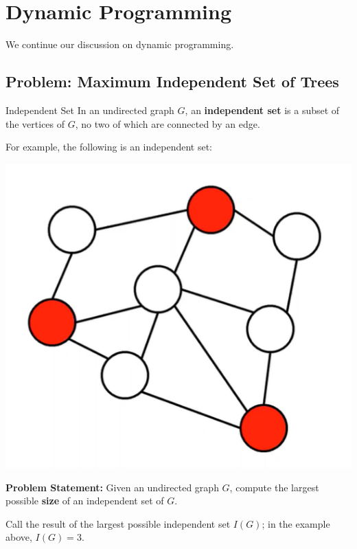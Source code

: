 \documentclass[letterpaper]{article}
\begin{document}
\section{Dynamic Programming}
We continue our discussion on dynamic programming. 

\subsection{Problem: Maximum Independent Set of Trees}

\begin{definition}{Independent Set}{}
    In an undirected graph $G$, an \textbf{independent set} is a subset of the vertices of $G$, no two of which are connected by an edge.
\end{definition}
For example, the following is an independent set:
\begin{center}
    \includegraphics[scale=0.3]{../assets/ind_set.png}
\end{center}

\textbf{Problem Statement:} Given an undirected graph $G$, compute the largest possible \textbf{size} of an independent set of $G$. 

\bigskip 

Call the result of the largest possible independent set $I(G)$; in the example above, $I(G) = 3$. 
\end{document}
